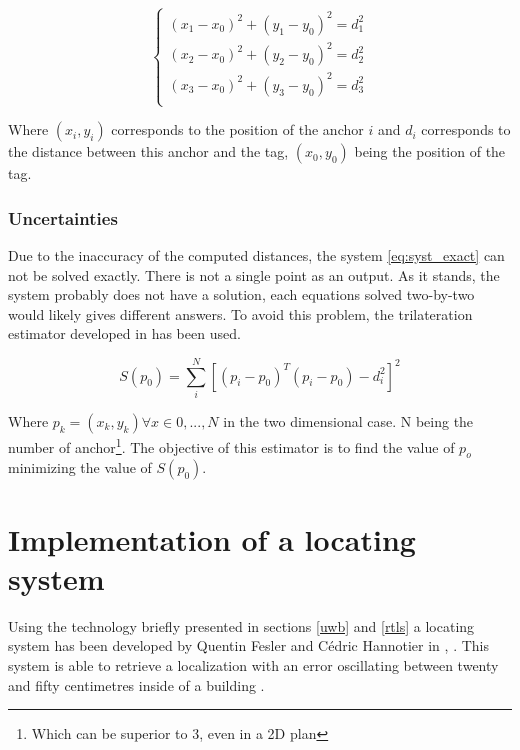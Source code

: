 \begin{equation}
\label{eq:syst_exact}
\begin{cases}
(x_1 - x_0)^2 + (y_1 - y_0)^2 = d_1^2 \\
(x_2 - x_0)^2 + (y_2 - y_0)^2 = d_2^2 \\
(x_3 - x_0)^2 + (y_3 - y_0)^2 = d_3^2 \\
\end{cases}
\end{equation}

Where $(x_i, y_i)$ corresponds to the position of the anchor $i$ and $d_i$ corresponds to the distance between this anchor and the tag, $(x_0, y_0)$ being the position of the tag.

\subsubsection{Uncertainties}

Due to the inaccuracy of the computed distances, the system \ref{eq:syst_exact} can not be solved exactly. There is not a single point as an output. As it stands, the system probably does not have a solution, each equations solved two-by-two would likely gives different answers. To avoid this problem, the trilateration estimator developed in \cite{zhou2009efficient} has been used.

\begin{equation}
\label{eq:syst_approx}
S(p_0) = \sum_i^N[(p_i - p_0)^T(p_i-p_0)-d_i^2]^2
\end{equation}

Where $p_k = (x_k, y_k) \forall x\in {0, ... , N}$ in the two dimensional case. N being the number of anchor\footnote{Which can be superior to 3, even in a 2D plan}. The objective of this estimator is to find the value of $p_o$ minimizing the value of $S(p_0)$.

\section{Implementation of a locating system}
\label{loc_syst}

Using the technology briefly presented in sections \ref{uwb} and \ref{rtls} a locating system has been developed by Quentin Fesler and Cédric Hannotier in  \cite{fesler2018high}, \cite{hannotier2019indoor}. This system is able to retrieve a localization with an error oscillating between twenty and fifty centimetres inside of a building \cite{guyard2019navigation}.
\vspace{2mm}

